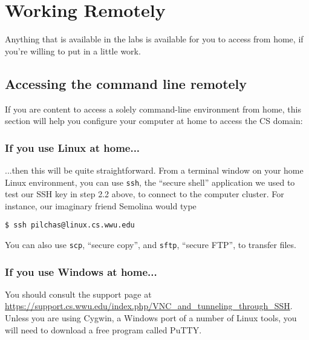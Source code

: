 \documentclass[12pt]{article}
\begin{document}
\section{Working Remotely}
Anything that is available in the labs is available for you to access from home, if you're willing to put in a little work.

\subsection{Accessing the command line remotely}
If you are content to access a solely command-line environment from home, this section will help you configure your computer at home to access the CS domain:

\subsubsection{If you use Linux at home...}
...then this will be quite straightforward.  From a terminal window on your home Linux environment, you can use \verb|ssh|, the ``secure shell'' application we used to test our SSH key in step 2.2 above, to connect to the computer cluster.  For instance, our imaginary friend Semolina would type
\begin{verbatim}
$ ssh pilchas@linux.cs.wwu.edu
\end{verbatim}
You can also use \verb|scp|, ``secure copy'', and \verb|sftp|, ``secure FTP'', to transfer files.

\subsubsection{If you use Windows at home...}
You should consult the support page at \url{https://support.cs.wwu.edu/index.php/VNC_and_tunneling_through_SSH}.  Unless you are using Cygwin, a Windows port of a number of Linux tools, you will need to download a free program called PuTTY.
\end{document}
